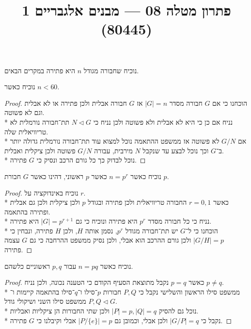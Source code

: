 
\title{פתרון מטלה 08 --- מבנים אלגבריים 1 (80445)}


\maketitle
\maketitleprint{}

\Question{}
נוכיח שחבורה מגודל $n$ היא פתירה במקרים הבאים.

\Subquestion{}
נוכיח כאשר $n < 60$.
\begin{proof}
	הוכחנו כי אם $G$ חבורה מסדר $|G| = n$ אז $G$ חבורה אבלית ולכן פתירה או לא אבלית וגם לא פשוטה. \\*
	נניח אם כן כי היא לא אבלית ולא פשוטה ולכן נניח כי $N \triangleleft G$ תת־חבורה נורמלית לא טריוויאלית שלה. \\*
	אם $G/N$ לא פשוטה אז ממשפט ההתאמה נוכל למצוא עוד תת־חבורה נורמלית גדולה יותר ב־$G$ וכך נוכל לבצע עד שנקבל $N$ מירבית, עבורה $G / N$ פשוטה ולכן ציקלית ואבלית. \\*
	נוכל לבדוק כך כל גורם הרכב ונסיק כי $G$ פתירה.
\end{proof}

\Subquestion{}
נוכיח כאשר $n = p^r$ כאשר $p$ ראשוני, דהינו כאשר $G$ חבורת $p$.
\begin{proof}
	נוכיח באינדוקציה על $r$. \\*
	כאשר $r = 0, 1$ החבורה טריוויאלית ולכן פתירה ובגודל $p$ ולכן ציקלית ולכן גם אבלית ופתירה בהתאמה. \\*
	נניח כי כל חבורה מסדר $p^r$ היא פתירה ונוכיח כי גם $|G| = p^{r + 1}$ היא פתירה. \\*
	הוכחנו כי ל־$G$ יש תת־חבורה מגודל $p^r$, נסמן אותה $H$, ולכן $H$ פתירה, ונבחין כי $|G / H| = p$ ולכן גורם ההרכב הוא אבלי, ולכן נסיק ממשפט ההרחבה כי גם $G$ עצמה פתירה.
\end{proof}

\Subquestion{}
נוכיח כאשר $n = p q$ עבור $p, q$ ראשוניים כלשהם.
\begin{proof}
	כאשר $p = q$ נקבל מתוצאת הסעיף הקודם כי הטענה נכונה, ולכן נניח $p \ne q$. \\*
	ממשפט סילו הראשון והשלישי נקבל כי $P, Q$ חבורות $p$־סילו ו־$q$־סילו בהתאמה קיימות ו־$P, Q \triangleleft G$ ממשפט סילו השני ושיקולי גודל. \\*
	נוכל גם להסיק $|P| = p, |Q| = q$ ולכן שתי החבורות הן ציקליות ואבליות. \\*
	נקבל כי $|G / P| = q$ ולכן אבלי, וכמובן גם $|P / \{e\}| = p$ אבלי וקיבלנו כי $G$ פתירה.
\end{proof}

